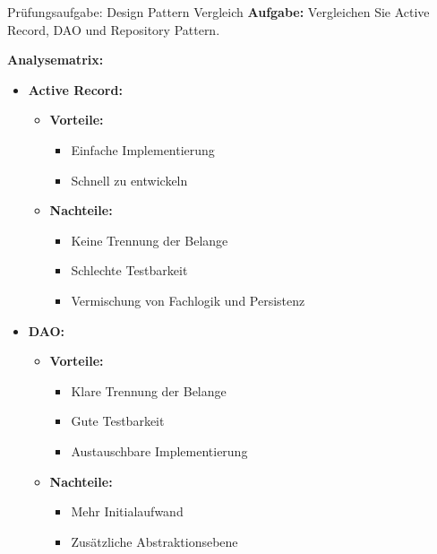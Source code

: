 \begin{example}{Prüfungsaufgabe: Design Pattern Vergleich}
\textbf{Aufgabe:}
Vergleichen Sie Active Record, DAO und Repository Pattern.

\textbf{Analysematrix:}
\begin{itemize}
    \item \textbf{Active Record:}
    \begin{itemize}
        \item \textbf{Vorteile:}
        \begin{itemize}
            \item Einfache Implementierung
            \item Schnell zu entwickeln
        \end{itemize}
        \item \textbf{Nachteile:}
        \begin{itemize}
            \item Keine Trennung der Belange
            \item Schlechte Testbarkeit
            \item Vermischung von Fachlogik und Persistenz
        \end{itemize}
    \end{itemize}
    
    \item \textbf{DAO:}
    \begin{itemize}
        \item \textbf{Vorteile:}
        \begin{itemize}
            \item Klare Trennung der Belange
            \item Gute Testbarkeit
            \item Austauschbare Implementierung
        \end{itemize}
        \item \textbf{Nachteile:}
        \begin{itemize}
            \item Mehr Initialaufwand
            \item Zusätzliche Abstraktionsebene
        \end{itemize}
    \end{itemize}
    

\end{itemize}
\end{example}
